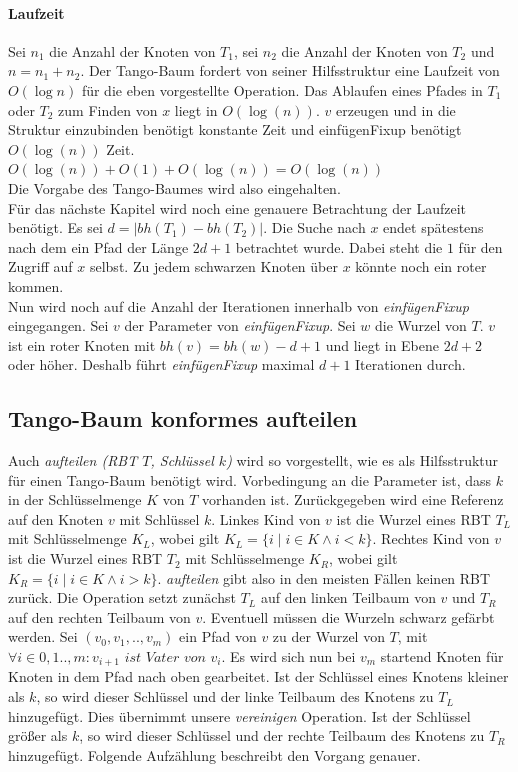 \documentclass[a4paper,12pt]{article}
\begin{document}
\paragraph{Laufzeit}
Sei $n_1$ die Anzahl der Knoten von $T_1$, sei $n_2$ die Anzahl der Knoten von $T_2$ und $n = n_1 + n_2$. Der Tango-Baum fordert von seiner Hilfsstruktur eine Laufzeit von $O(\log n)$ für die eben vorgestellte Operation.  Das Ablaufen eines Pfades in $T_1$ oder $T_2$ zum Finden von $x$ liegt in $O(\log (n))$. $v$ erzeugen und in die Struktur einzubinden benötigt konstante Zeit und einfügenFixup benötigt  $O(\log (n))$ Zeit.\\
$O(\log (n)) + O(1) +O(\log (n)) = O(\log (n
))$\\
Die Vorgabe des Tango-Baumes wird also eingehalten.\\
Für das nächste Kapitel wird noch eine genauere Betrachtung der Laufzeit benötigt. Es sei $d = \vert \mathit{bh}(T_1) - \mathit{bh}(T_2)  \vert $. Die Suche nach $x$ endet spätestens nach dem ein Pfad der Länge $2d + 1$ betrachtet wurde. Dabei steht die $1$ für den Zugriff auf $x$ selbst. Zu jedem schwarzen Knoten über $x$ könnte noch ein roter kommen.\\
Nun wird noch auf die Anzahl der Iterationen innerhalb von \textit{einfügenFixup} eingegangen. Sei $v$ der Parameter von \textit{einfügenFixup}. Sei $w$ die Wurzel von $T$. $v$ ist ein roter Knoten mit $\mathit{bh}(v) = \mathit{bh}(w) - d + 1$ und liegt in Ebene $2d + 2$ oder höher. Deshalb führt \textit{einfügenFixup} maximal $d + 1$ Iterationen durch.  

\subsection{Tango-Baum konformes aufteilen}
Auch \textit{aufteilen (RBT $T$, Schlüssel $k$)} wird so vorgestellt, wie es als Hilfsstruktur für einen Tango-Baum benötigt wird. Vorbedingung an die Parameter ist, dass $k$ in der Schlüsselmenge $K$ von $T$ vorhanden ist. Zurückgegeben wird eine Referenz auf den Knoten $v$ mit Schlüssel $k$. Linkes Kind von $v$ ist die Wurzel eines RBT $T_L$ mit Schlüsselmenge $K_L$, wobei gilt ${K_L=\{i \mid  i\in K \land i <k\}}$. Rechtes Kind von $v$ ist die Wurzel eines RBT $T_2$ mit Schlüsselmenge $K_R$, wobei gilt ${K_R = \{i \mid i\in K \land i > k\}}$. \textit{aufteilen} gibt also in den meisten Fällen keinen RBT zurück. Die Operation setzt zunächst $T_L$ auf den linken Teilbaum von $v$ und $T_R$ auf den rechten Teilbaum von $v$. Eventuell müssen die Wurzeln schwarz gefärbt werden. Sei $(v_0,v_1,..,v_m)$  ein Pfad von $v$ zu der Wurzel von $T$, mit $\forall i \in {0,1..,m}\colon v_{i+1}\textit{ ist Vater von } v_i$. Es wird sich nun bei $v_m$ startend Knoten für Knoten in dem Pfad nach oben gearbeitet. Ist der Schlüssel eines Knotens kleiner als $k$, so wird dieser Schlüssel und der linke Teilbaum des Knotens zu $T_L$ hinzugefügt. Dies übernimmt unsere \textit{vereinigen} Operation. Ist der Schlüssel größer als $k$, so wird dieser Schlüssel und der rechte Teilbaum des Knotens zu $T_R$ hinzugefügt. Folgende Aufzählung beschreibt den Vorgang genauer.
\end{document}
